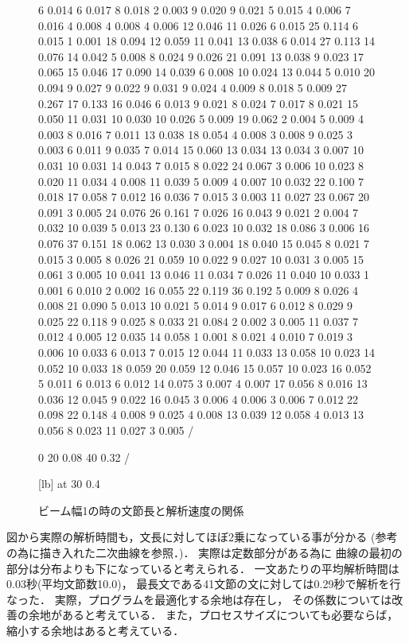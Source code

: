 \begin{figure}[htbp]
6 0.014  6 0.017  8 0.018  2 0.003  9 0.020  
9 0.021  5 0.015  4 0.006  7 0.016  4 0.008  
4 0.008  4 0.006  12 0.046  11 0.026  
6 0.015  25 0.114  6 0.015  1 0.001  18 0.094  
12 0.059  11 0.041  13 0.038  6 0.014  27 0.113  
14 0.076  14 0.042  5 0.008  8 0.024  9 0.026  
21 0.091  13 0.038  9 0.023  17 0.065  15 0.046  
17 0.090  14 0.039  6 0.008  10 0.024  13 0.044  
5 0.010  20 0.094  9 0.027  9 0.022  9 0.031  
9 0.024  4 0.009  8 0.018  5 0.009  27 0.267  
17 0.133  16 0.046  6 0.013  9 0.021  8 0.024  
7 0.017  8 0.021  15 0.050  11 0.031  10 0.030  
10 0.026  5 0.009  19 0.062  2 0.004  5 0.009  
4 0.003  8 0.016  7 0.011  13 0.038  18 0.054  
4 0.008  3 0.008  9 0.025  3 0.003  6 0.011  
9 0.035  7 0.014  15 0.060  13 0.034  13 0.034  
3 0.007  10 0.031  10 0.031  14 0.043  7 0.015  
8 0.022  24 0.067  3 0.006  10 0.023  8 0.020  
11 0.034  4 0.008  11 0.039  5 0.009  4 0.007  
10 0.032  22 0.100  7 0.018  17 0.058  7 0.012  
16 0.036  7 0.015  3 0.003  11 0.027  23 0.067  
20 0.091  3 0.005  24 0.076  26 0.161  7 0.026  
16 0.043  9 0.021  2 0.004  7 0.032  10 0.039  
5 0.013  23 0.130  6 0.023  10 0.032  18 0.086  
3 0.006  16 0.076  37 0.151  18 0.062  13 0.030  
3 0.004  18 0.040  15 0.045  8 0.021  7 0.015  
3 0.005  8 0.026  21 0.059  10 0.022  9 0.027  
10 0.031  3 0.005  15 0.061  3 0.005  10 0.041  
13 0.046  11 0.034  7 0.026  11 0.040  10 0.033  
1 0.001  6 0.010  2 0.002  16 0.055  22 0.119  
36 0.192  5 0.009  8 0.026  4 0.008  21 0.090  
5 0.013  10 0.021  5 0.014  9 0.017  6 0.012  
8 0.029  9 0.025  22 0.118  9 0.025  8 0.033  
21 0.084  2 0.002  3 0.005  11 0.037  7 0.012  
4 0.005  12 0.035  14 0.058  1 0.001  8 0.021  
4 0.010  7 0.019  3 0.006  10 0.033  6 0.013  
7 0.015  12 0.044  11 0.033  13 0.058  10 0.023  
14 0.052  10 0.033  18 0.059  20 0.059  12 0.046  
15 0.057  10 0.023  16 0.052  5 0.011  6 0.013  
6 0.012  14 0.075  3 0.007  4 0.007  17 0.056  
8 0.016  13 0.036  12 0.045  9 0.022  16 0.045  
3 0.006  4 0.006  3 0.006  7 0.012  22 0.098  
22 0.148  4 0.008  9 0.025  4 0.008  13 0.039  
12 0.058  4 0.013  13 0.056  8 0.023  
11 0.027  3 0.005  /

\setquadratic
{} 0 20 0.08 40 0.32 /

 [lb] at 30 0.4

\endpicture
  \caption{ビーム幅1の時の文節長と解析速度の関係}
  \label{Kaisekisokudo}
\end{figure}
図から実際の解析時間も，文長に対してほぼ2乗になっている事が分かる
(参考の為に描き入れた二次曲線を参照．)．
実際は定数部分がある為に
曲線の最初の部分は分布よりも下になっていると考えられる．
一文あたりの平均解析時間は0.03秒(平均文節数10.0)，
最長文である41文節の文に対しては0.29秒で解析を行なった．
実際，プログラムを最適化する余地は存在し，
その係数については改善の余地があると考えている．
また，プロセスサイズについても必要ならば，
縮小する余地はあると考えている．


